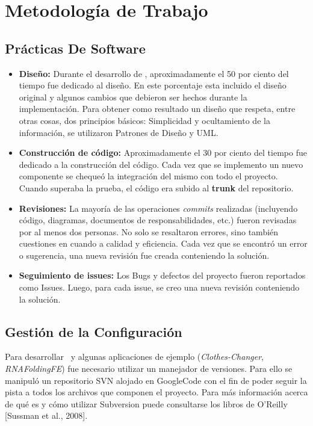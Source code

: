 \chapter{Metodolog\'ia de Trabajo}

\section{Pr\'acticas De Software}

\begin{itemize}
 \item \textbf{Dise\~no:} Durante el desarrollo de \combeng, aproximadamente el 50 por ciento del tiempo fue dedicado al dise\~no. En este porcentaje esta 
   incluido el dise\~no original y algunos cambios que debieron ser hechos durante la implementaci\'on. 
   Para obtener como resultado un dise\~no que respeta, entre otras cosas, dos principios b\'asicos: Simplicidad y ocultamiento de la informaci\'on, 
   se utilizaron Patrones de Dise\~no\cite{Gamma95} y UML.
 \item \textbf{Construcci\'on de c\'odigo:} Aproximadamente el 30 por ciento del tiempo fue dedicado a la construcci\'on del c\'odigo. Cada vez que se implemento un nuevo componente se cheque\'o la integraci\'on del mismo con todo el proyecto. Cuando superaba la prueba, el c\'odigo era subido al \textbf{trunk} del repositorio.
 \item \textbf{Revisiones:} La mayor\'ia de las operaciones \emph{commits} realizadas (incluyendo c\'odigo, diagramas, documentos de responsabilidades, etc.) fueron revisadas por al menos dos personas. No solo se resaltaron errores, sino tambi\'en cuestiones en cuando a calidad y eficiencia. Cada vez que se encontr\'o un error o sugerencia, una nueva revisi\'on fue creada conteniendo la soluci\'on.
 \item \textbf{Seguimiento de issues:} Los Bugs y defectos del proyecto fueron reportados como Issues. Luego, para cada issue, se creo una nueva revisi\'on conteniendo la soluci\'on.
 \end{itemize}

\section{Gesti\'on de la Configuraci\'on}
Para desarrollar \combeng \ y algunas aplicaciones de ejemplo (\textit{Clothes-Changer}, \textit{RNAFoldingFE}) fue necesario utilizar un manejador de versiones.
Para ello se manipul\'o un repositorio SVN alojado en GoogleCode con el fin de poder seguir la pista a todos los archivos que componen el proyecto.
Para m\'as informaci\'on acerca de qu\'e es y c\'omo utilizar Subversion puede consultarse los libros de O'Reilly [Sussman et al., 2008]. 


